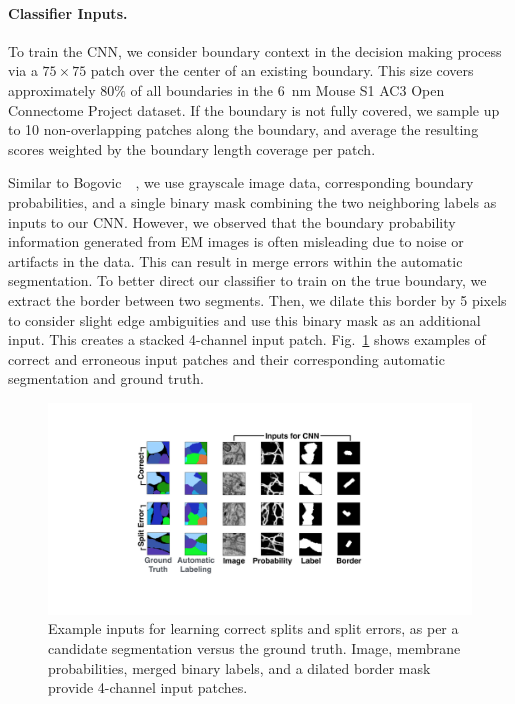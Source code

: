 \paragraph{Classifier Inputs.} To train the CNN, we consider boundary context in the decision making process via a $75\times75$ patch over the center of an existing boundary. This size covers approximately $80\%$ of all boundaries in the 6~nm Mouse S1 AC3 Open Connectome Project dataset. If the boundary is not fully covered, we sample up to 10 non-overlapping patches along the boundary, and average the resulting scores weighted by the boundary length coverage per patch.

Similar to Bogovic~\etal~\cite{BogovicHJ13}, we use grayscale image data, corresponding boundary probabilities, and a single binary mask combining the two neighboring labels as inputs to our CNN. However, we observed that the boundary probability information generated from EM images is often misleading due to noise or artifacts in the data. This can result in merge errors within the automatic segmentation. To better direct our classifier to train on the true boundary, we extract the border between two segments. Then, we dilate this border by 5 pixels to consider slight edge ambiguities and use this binary mask as an additional input. This creates a stacked 4-channel input patch. Fig.~\ref{fig:cnn_inputs} shows examples of correct and erroneous input patches and their corresponding automatic segmentation and ground truth.

\begin{figure}[t]
\centering
\includegraphics[width=\linewidth]{gfx/cnn_inputs.pdf}
\caption{Example inputs for learning correct splits and split errors, as per a candidate segmentation versus the ground truth. Image, membrane probabilities, merged binary labels, and a dilated border mask provide 4-channel input patches.}
\label{fig:cnn_inputs}
\end{figure}


